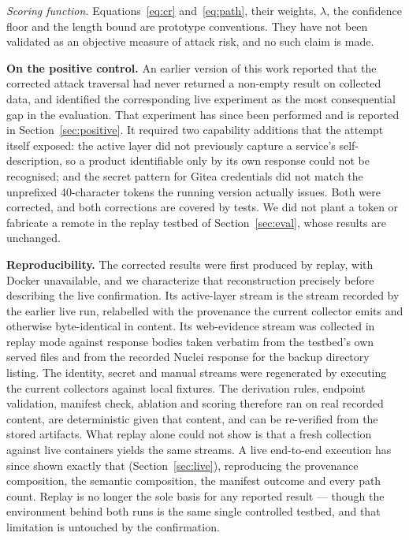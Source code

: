 \documentclass[11pt,a4paper]{article}
\begin{document}
\emph{Scoring function.} Equations~\eqref{eq:cr} and~\eqref{eq:path}, their weights, $\lambda$, the confidence floor and the length bound are prototype conventions. They have not been validated as an objective measure of attack risk, and no such claim is made.

\textbf{On the positive control.} An earlier version of this work reported that the corrected attack traversal had never returned a non-empty result on collected data, and identified the corresponding live experiment as the most consequential gap in the evaluation. That experiment has since been performed and is reported in Section~\ref{sec:positive}. It required two capability additions that the attempt itself exposed: the active layer did not previously capture a service's self-description, so a product identifiable only by its own response could not be recognised; and the secret pattern for Gitea credentials did not match the unprefixed 40-character tokens the running version actually issues. Both were corrected, and both corrections are covered by tests. We did not plant a token or fabricate a remote in the replay testbed of Section~\ref{sec:eval}, whose results are unchanged.

\textbf{Reproducibility.} The corrected results were first produced by replay, with Docker unavailable, and we characterize that reconstruction precisely before describing the live confirmation. Its active-layer stream is the stream recorded by the earlier live run, relabelled with the provenance the current collector emits and otherwise byte-identical in content. Its web-evidence stream was collected in replay mode against response bodies taken verbatim from the testbed's own served files and from the recorded Nuclei response for the backup directory listing. The identity, secret and manual streams were regenerated by executing the current collectors against local fixtures. The derivation rules, endpoint validation, manifest check, ablation and scoring therefore ran on real recorded content, are deterministic given that content, and can be re-verified from the stored artifacts. What replay alone could not show is that a fresh collection against live containers yields the same streams. A live end-to-end execution has since shown exactly that (Section~\ref{sec:live}), reproducing the provenance composition, the semantic composition, the manifest outcome and every path count. Replay is no longer the sole basis for any reported result --- though the environment behind both runs is the same single controlled testbed, and that limitation is untouched by the confirmation.
\end{document}
